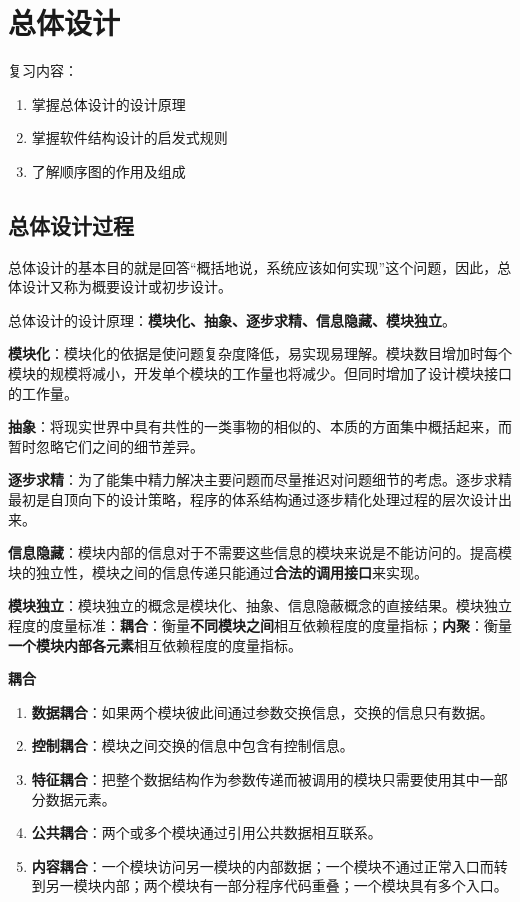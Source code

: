 \documentclass[cn, blue, normal, 12pt]{elegantnote}
\begin{document}
\section{总体设计}

复习内容：

\begin{enumerate}
    \item 掌握总体设计的设计原理
    \item 掌握软件结构设计的启发式规则
    \item 了解顺序图的作用及组成
\end{enumerate}

\subsection{总体设计过程}

总体设计的基本目的就是回答“概括地说，系统应该如何实现”这个问题，因此，总体设计又称为概要设计或初步设计。

总体设计的设计原理：\textbf{模块化、抽象、逐步求精、信息隐藏、模块独立}。

\textbf{模块化}：模块化的依据是使问题复杂度降低，易实现易理解。模块数目增加时每个模块的规模将减小，开发单个模块的工作量也将减少。但同时增加了设计模块接口的工作量。

\textbf{抽象}：将现实世界中具有共性的一类事物的相似的、本质的方面集中概括起来，而暂时忽略它们之间的细节差异。

\textbf{逐步求精}：为了能集中精力解决主要问题而尽量推迟对问题细节的考虑。逐步求精最初是自顶向下的设计策略，程序的体系结构通过逐步精化处理过程的层次设计出来。

\textbf{信息隐藏}：模块内部的信息对于不需要这些信息的模块来说是不能访问的。提高模块的独立性，模块之间的信息传递只能通过\textbf{合法的调用接口}来实现。

\textbf{模块独立}：模块独立的概念是模块化、抽象、信息隐蔽概念的直接结果。模块独立程度的度量标准：\textbf{耦合}：衡量\textbf{不同模块之间}相互依赖程度的度量指标；\textbf{内聚}：衡量\textbf{一个模块内部各元素}相互依赖程度的度量指标。

\textbf{耦合}

\begin{enumerate}
    \item \textbf{数据耦合}：如果两个模块彼此间通过参数交换信息，交换的信息只有数据。
    \item \textbf{控制耦合}：模块之间交换的信息中包含有控制信息。
    \item \textbf{特征耦合}：把整个数据结构作为参数传递而被调用的模块只需要使用其中一部分数据元素。
    \item \textbf{公共耦合}：两个或多个模块通过引用公共数据相互联系。
    \item \textbf{内容耦合}：一个模块访问另一模块的内部数据；一个模块不通过正常入口而转到另一模块内部；两个模块有一部分程序代码重叠；一个模块具有多个入口。
\end{enumerate}
\end{document}
